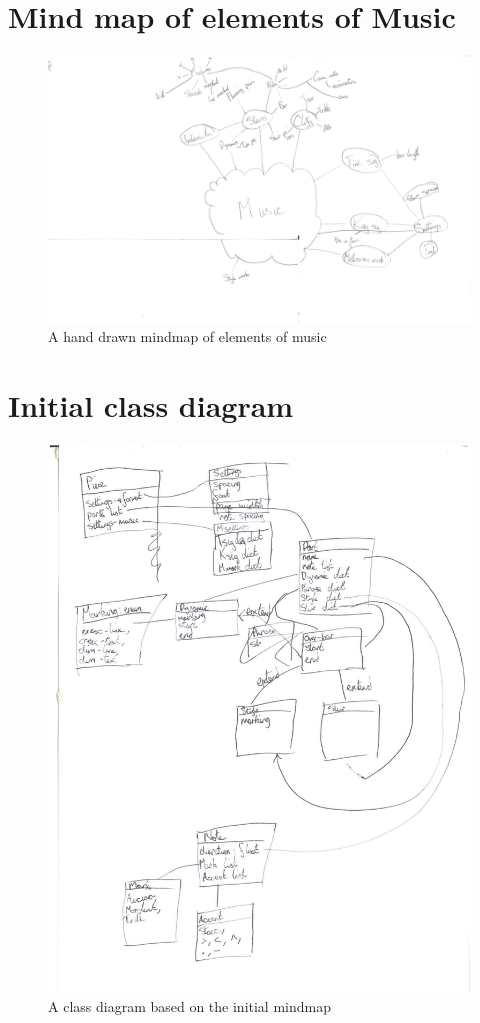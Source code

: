 \begin{appendices}
\section{Mind map of elements of Music}
\begin{figure}[h]
\centering
\includegraphics[width=500pt]{mindmap}
\caption{A hand drawn mindmap of elements of music}	
\end{figure}

\section{Initial class diagram}
\begin{figure}[H]
\centering
\includegraphics[width=400pt]{class-diagram}
\caption{A class diagram based on the initial mindmap}
\end{figure}
\begin{landscape}

\end{landscape}
\end{appendices}
